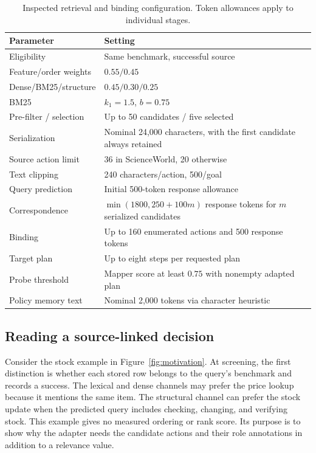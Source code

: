 \begin{table}[t]
  \caption{Inspected retrieval and binding configuration. Token allowances apply to individual stages.}
  \label{tab:parameters}
  \begin{tabularx}{\columnwidth}{@{}lX@{}}
    \toprule
    Parameter & Setting \\
    \midrule
    Eligibility & Same benchmark, successful source \\
    Feature/order weights & $0.55/0.45$ \\
    Dense/BM25/structure & $0.45/0.30/0.25$ \\
    BM25 & $k_1=1.5$, $b=0.75$ \\
    Pre-filter / selection & Up to 50 candidates / five selected \\
    Serialization & Nominal 24,000 characters, with the first candidate always retained \\
    Source action limit & 36 in ScienceWorld, 20 otherwise \\
    Text clipping & 240 characters/action, 500/goal \\
    Query prediction & Initial 500-token response allowance \\
    Correspondence & $\min(1800,250+100m)$ response tokens for $m$ serialized candidates \\
    Binding & Up to 160 enumerated actions and 500 response tokens \\
    Target plan & Up to eight steps per requested plan \\
    Probe threshold & Mapper score at least $0.75$ with nonempty adapted plan \\
    Policy memory text & Nominal 2,000 tokens via character heuristic \\
    \bottomrule
  \end{tabularx}
\end{table}

\subsection{Reading a source-linked decision}
Consider the stock example in Figure~\ref{fig:motivation}. At screening, the first distinction is whether each stored row belongs to the query's benchmark and records a success. The lexical and dense channels may prefer the price lookup because it mentions the same item. The structural channel can prefer the stock update when the predicted query includes checking, changing, and verifying stock. This example gives no measured ordering or rank score. Its purpose is to show why the adapter needs the candidate actions and their role annotations in addition to a relevance value.

